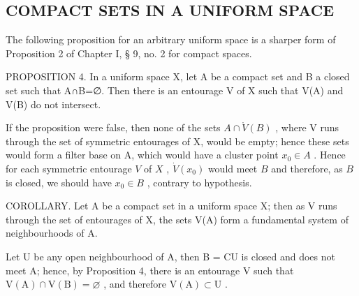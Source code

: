 \subsection{COMPACT SETS IN A UNIFORM SPACE}

The following proposition for an arbitrary uniform space is a sharper form of Proposition 2 of Chapter I, § 9, no. 2 for compact spaces.

PROPOSITION 4. In a uniform space X, let A be a compact set and B a closed set such that A∩B=∅. Then there is an entourage V of X such that V(A) and V(B) do not intersect.

If the proposition were false, then none of the sets \(A \cap \mathring{V}(B)\) , where V runs through the set of symmetric entourages of X, would be empty; hence these sets would form a filter base on A, which would have a cluster point \(x_0 \in A\) . Hence for each symmetric entourage \(V\) of \(X\) , \(\dot{V}(x_0)\) would meet \(B\) and therefore, as \(B\) is closed, we should have \(x_0 \in B\) , contrary to hypothesis.

COROLLARY. Let A be a compact set in a uniform space X; then as V runs through the set of entourages of X, the sets V(A) form a fundamental system of neighbourhoods of A.

Let U be any open neighbourhood of A, then B = CU is closed and does not meet A; hence, by Proposition 4, there is an entourage V such that \(\mathrm{V}(\mathrm{A}) \cap \mathrm{V}(\mathrm{B}) = \varnothing\) , and therefore \(\mathrm{V}(\mathrm{A}) \subset \mathrm{U}\) .

